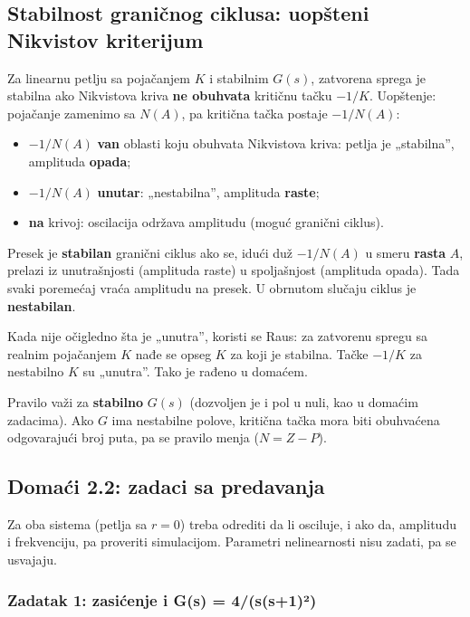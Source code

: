 \documentclass[11pt,a4paper,parskip=half,headsepline,numbers=noenddot]{scrartcl}
\begin{document}
\subsection{Stabilnost graničnog ciklusa: uopšteni Nikvistov kriterijum}

Za linearnu petlju sa pojačanjem \(K\) i stabilnim \(G(s)\), zatvorena sprega je stabilna ako Nikvistova kriva \textbf{ne obuhvata} kritičnu tačku \(-1/K\). Uopštenje: pojačanje zamenimo sa \(N(A)\), pa kritična tačka postaje \(-1/N(A)\):

\begin{itemize}
\item \(-1/N(A)\) \textbf{van} oblasti koju obuhvata Nikvistova kriva: petlja je „stabilna'', amplituda \textbf{opada};
\item \(-1/N(A)\) \textbf{unutar}: „nestabilna'', amplituda \textbf{raste};
\item \textbf{na} krivoj: oscilacija održava amplitudu (moguć granični ciklus).
\end{itemize}

\begin{kljucna}
Presek je \textbf{stabilan} granični ciklus ako se, idući duž \(-1/N(A)\) u smeru \textbf{rasta} \(A\), prelazi iz unutrašnjosti (amplituda raste) u spoljašnjost (amplituda opada). Tada svaki poremećaj vraća amplitudu na presek. U obrnutom slučaju ciklus je \textbf{nestabilan}.
\end{kljucna}

Kada nije očigledno šta je „unutra'', koristi se Raus: za zatvorenu spregu sa realnim pojačanjem \(K\) nađe se opseg \(K\) za koji je stabilna. Tačke \(-1/K\) za nestabilno \(K\) su „unutra''. Tako je rađeno u domaćem.

Pravilo važi za \textbf{stabilno} \(G(s)\) (dozvoljen je i pol u nuli, kao u domaćim zadacima). Ako \(G\) ima nestabilne polove, kritična tačka mora biti obuhvaćena odgovarajući broj puta, pa se pravilo menja (\(N = Z - P\)).

\subsection{Domaći 2.2: zadaci sa predavanja}

Za oba sistema (petlja sa \(r = 0\)) treba odrediti da li osciluje, i ako da, amplitudu i frekvenciju, pa proveriti simulacijom. Parametri nelinearnosti nisu zadati, pa se usvajaju.

\subsubsection{Zadatak 1: zasićenje i G(s) = 4/(s(s+1)²)}
\end{document}
